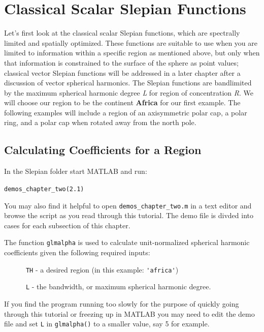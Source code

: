 \documentclass[11pt]{article}
\begin{document}
\section{Classical Scalar Slepian Functions}
%
Let's first look at the classical scalar Slepian functions, which are spectrally limited and spatially optimized. These functions are suitable to use when you are limited to information within a specific region as mentioned above, but only when that information is constrained to the surface of the sphere as point values; classical vector Slepian functions will be addressed in a later chapter after a discussion of vector spherical harmonics. The Slepian functions are bandlimited by the maximum spherical harmonic degree \textit{L} for region of concentration \textit{R}. We will choose our region to be the continent \textbf{Africa} for our first example. The following examples will include a region of an axisymmetric polar cap, a polar ring, and a polar cap when rotated away from the north pole.

\subsection{Calculating Coefficients for a Region}

In the Slepian folder start MATLAB and run: 

\verb|demos_chapter_two(2.1)|

You may also find it helpful to open \verb|demos_chapter_two.m| in a text editor and browse the script as you read through this tutorial. The demo file is divded into cases for each subsection of this chapter. 

The function \verb+glmalpha+ is used to calculate unit-normalized spherical harmonic coefficients given the following required inputs:

\verb+		TH+ - a desired region (in this example: \verb+'africa'+)

\verb+		L+ - the bandwidth, or maximum spherical harmonic degree. 

If you find the program running too slowly for the purpose of quickly going through this tutorial or freezing up in MATLAB you may need to edit the demo file and set \verb|L| in \verb|glmalpha()| to a smaller value, say 5 for example.
\end{document}
